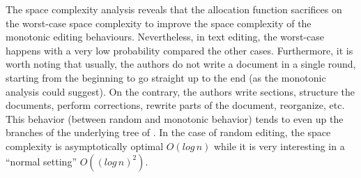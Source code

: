 The space complexity analysis reveals that the allocation function \LSEQ
sacrifices on the worst-case space complexity to improve the space complexity of
the monotonic editing behaviours. Nevertheless, in text editing, the worst-case
happens with a very low probability compared the other cases. Furthermore, it is
worth noting that usually, the authors do not write a document in a single
round, starting from the beginning to go straight up to the end (as the
monotonic analysis could suggest). On the contrary, the authors write sections,
structure the documents, perform corrections, rewrite parts of the document,
reorganize, etc. This behavior (between random and monotonic behavior) tends to
even up the branches of the underlying tree of \LSEQ. In the case of random
editing, the space complexity is asymptotically optimal $O(log\,n)$ while it is
very interesting in a ``normal setting'' $O((log\,n)^2)$.

